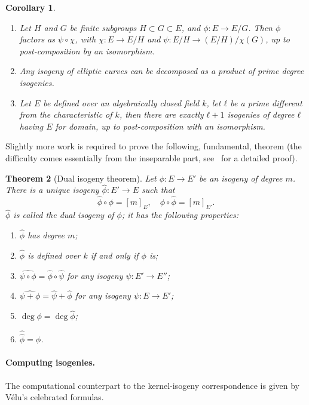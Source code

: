 \documentclass[10pt]{article}
\theoremstyle{plain}
\newtheorem{theorem}{Theorem}
\newtheorem{corollary}[theorem]{Corollary}
\theoremstyle{definition}
\begin{document}
\begin{corollary}\ 
  \label{coro:isog-basic}
  \begin{enumerate}
  \item Let $H$ and $G$ be finite subgroups $H ⊂ G ⊂ E$, and
    $ϕ: E \to E/G$. %
    Then $ϕ$ factors as $ψ∘χ$, with $χ : E → E/H$ and
    $ψ : E/H → (E/H)/χ(G)$, up to post-composition by an isomorphism.
  \item Any isogeny of elliptic curves can be decomposed as a product
    of prime degree isogenies.
  \item Let $E$ be defined over an algebraically closed field $k$, let
    $ℓ$ be a prime different from the characteristic of $k$, then
    there are exactly $ℓ+1$ isogenies of degree $ℓ$ having $E$ for domain,
    up to post-composition with an isomorphism.
  \end{enumerate}
\end{corollary}

Slightly more work is required to prove the following, fundamental,
theorem (the difficulty comes essentially from the inseparable part,
see~\cite[III.6.1]{silverman:elliptic} for a detailed proof).

\begin{theorem}[Dual isogeny theorem]
  Let $ϕ:E→ E'$ be an isogeny of degree $m$. %
  There is a unique isogeny $\hat{ϕ}:E'→ E$ such that
  \[\hat{ϕ}∘ϕ = [m]_E, \quad ϕ∘\hat{ϕ} = [m]_{E'}.\] %
  $\hat{ϕ}$ is called the \emph{dual isogeny of $ϕ$}; it has the
  following properties:
  
  \begin{enumerate}
  \item $\hat{ϕ}$ has degree $m$;
  \item $\hat{ϕ}$ is defined over $k$ if and only if $ϕ$ is;
  \item $\widehat{ψ∘ϕ} = \hat{ϕ}∘\hat{ψ}$ for any isogeny $ψ:E'→ E''$;
  \item $\widehat{ψ+ϕ} = \hat{ψ} + \hat{ϕ}$ for any isogeny $ψ:E→ E'$;
  \item $\deg ϕ = \deg\hat{ϕ}$;
  \item $\hat{\hat{ϕ}} = ϕ$.
  \end{enumerate}
\end{theorem}

\paragraph{Computing isogenies.}
The computational counterpart to the kernel-isogeny correspondence is
given by Vélu's celebrated formulas. %
\end{document}
